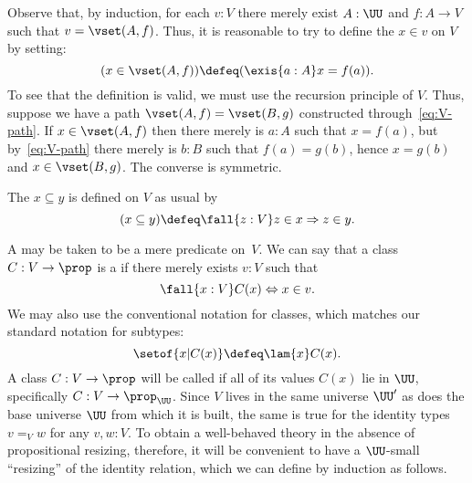 Observe that, by induction, for each $v:V$ there merely exist $A:\UU$ and $f:A\to V$ such that $v=\vset(A,f)$.
Thus, it is reasonable to try to define the 
%
$x\in v$ on $V$ by setting:
%
%
\begin{equation*}
  (x \in \vset(A,f)) \defeq (\exis{a : A} x = f(a)).
\end{equation*}
%
To see that the definition is valid, we must use the recursion principle of $V$.  Thus, suppose we have a path $\vset(A, f) = \vset(B, g)$
constructed through~\eqref{eq:V-path}. If $x \in \vset(A,f)$ then there merely is $a : A$ such
that $x = f(a)$, but by~\eqref{eq:V-path} there merely is $b : B$ such that $f(a) = g(b)$, hence
$x = g(b)$ and $x \in \vset(B,g)$. The converse is symmetric.

The 
%
$x\subseteq y$ is defined on $V$ as usual by
%
\begin{equation*}
  (x \subseteq y) \defeq \fall{z : V} z \in x \Rightarrow z \in y.
\end{equation*}

A 
%
may be taken to be a mere predicate on~$V$. We can say that a class $C : V \to \prop$ is a
%
if there merely exists $v:V$ such that
%
\begin{equation*}
  \fall{x : V} C(x) \Leftrightarrow x \in v.
\end{equation*}
We may also use the conventional notation for classes, which matches our standard notation for subtypes:
\begin{equation}
  \setof{ x | C(x) } \defeq \lam{x}C(x).\label{eq:class-notation}
\end{equation}
%
A class $C: V\to \prop$ will be called 
%
%
if all of its values $C(x)$ lie in $\UU$, specifically $C: V\to \prop_{\UU}$.
Since $V$ lives in the same universe $\UU'$ as does the base universe $\UU$ from which it is built, the same is true for the identity types $v=_V w$ for any $v,w:V$. To obtain a well-behaved theory in the absence of propositional resizing,
%
%
therefore, it will be convenient to have a $\UU$-small ``resizing'' of the identity relation, which we can define by induction as follows.

